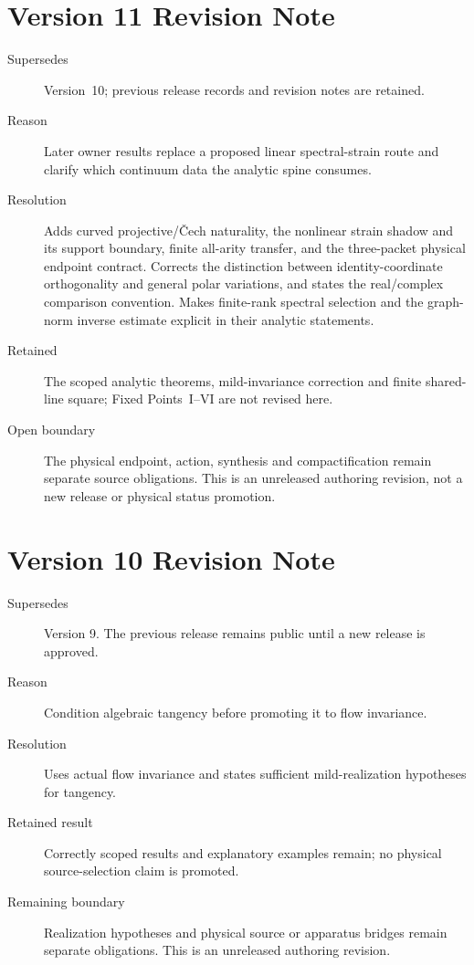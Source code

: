 \documentclass[11pt]{article}
\begin{document}
\section*{Version 11 Revision Note}
\begin{description}
\item[Supersedes] Version~10; previous release records and revision notes are retained.
\item[Reason] Later owner results replace a proposed linear spectral-strain
route and clarify which continuum data the analytic spine consumes.
\item[Resolution] Adds curved projective/\v{C}ech naturality, the nonlinear
strain shadow and its support boundary, finite all-arity transfer, and the
three-packet physical endpoint contract. Corrects the distinction between
identity-coordinate orthogonality and general polar variations, and states
the real/complex comparison convention.
Makes finite-rank spectral selection and the graph-norm inverse estimate
explicit in their analytic statements.
\item[Retained] The scoped analytic theorems, mild-invariance correction and
finite shared-line square; Fixed Points~I--VI are not revised here.
\item[Open boundary] The physical endpoint, action, synthesis and
compactification remain separate source obligations. This is an unreleased
authoring revision, not a new release or physical status promotion.
\end{description}

\section*{Version 10 Revision Note}
\begin{description}
\item[Supersedes] Version 9. The previous release remains public until a new release is approved.
\item[Reason] Condition algebraic tangency before promoting it to flow invariance.
\item[Resolution] Uses actual flow invariance and states sufficient mild-realization hypotheses for tangency.
\item[Retained result] Correctly scoped results and explanatory examples remain; no physical source-selection claim is promoted.
\item[Remaining boundary] Realization hypotheses and physical source or apparatus bridges remain separate obligations. This is an unreleased authoring revision.
\end{description}
\end{document}
